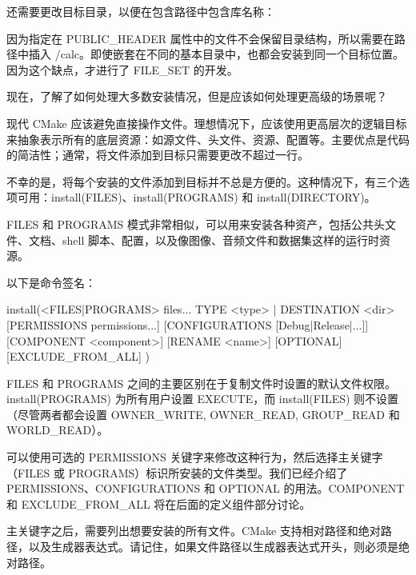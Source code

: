 还需要更改目标目录，以便在包含路径中包含库名称：



因为指定在 PUBLIC\_HEADER 属性中的文件不会保留目录结构，所以需要在路径中插入 /calc。即使嵌套在不同的基本目录中，也都会安装到同一个目标位置。因为这个缺点，才进行了 FILE\_SET 的开发。

现在，了解了如何处理大多数安装情况，但是应该如何处理更高级的场景呢？


现代 CMake 应该避免直接操作文件。理想情况下，应该使用更高层次的逻辑目标来抽象表示所有的底层资源：如源文件、头文件、资源、配置等。主要优点是代码的简洁性；通常，将文件添加到目标只需要更改不超过一行。

不幸的是，将每个安装的文件添加到目标并不总是方便的。这种情况下，有三个选项可用：install(FILES)、install(PROGRAMS) 和 install(DIRECTORY)。


FILES 和 PROGRAMS 模式非常相似，可以用来安装各种资产，包括公共头文件、文档、shell 脚本、配置，以及像图像、音频文件和数据集这样的运行时资源。

以下是命令签名：

\begin{shell}
install(<FILES|PROGRAMS> files...
        TYPE <type> | DESTINATION <dir>
        [PERMISSIONS permissions...]
        [CONFIGURATIONS [Debug|Release|...]]
        [COMPONENT <component>]
        [RENAME <name>] [OPTIONAL] [EXCLUDE_FROM_ALL]
)
\end{shell}

FILES 和 PROGRAMS 之间的主要区别在于复制文件时设置的默认文件权限。install(PROGRAMS) 为所有用户设置 EXECUTE，而 install(FILES) 则不设置（尽管两者都会设置 OWNER\_WRITE, OWNER\_READ, GROUP\_READ 和 WORLD\_READ）。

可以使用可选的 PERMISSIONS 关键字来修改这种行为，然后选择主关键字（FILES 或 PROGRAMS）标识所安装的文件类型。我们已经介绍了 PERMISSIONS、CONFIGURATIONS 和 OPTIONAL 的用法。COMPONENT 和 EXCLUDE\_FROM\_ALL 将在后面的定义组件部分讨论。

主关键字之后，需要列出想要安装的所有文件。CMake 支持相对路径和绝对路径，以及生成器表达式。请记住，如果文件路径以生成器表达式开头，则必须是绝对路径。

